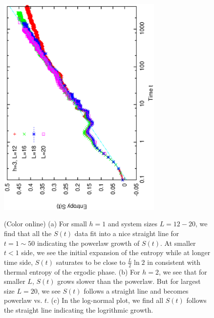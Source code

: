 \documentclass[prl,aps,epsf,showpacs,twocolumn]{revtex4}
\begin{document}
\begin{figure}[b]
   \includegraphics[angle=-90,width=3.2in]{newfig1e.ps}\\
  \vspace{0.12in}
  \caption{(Color online) (a) For small $h=1$ and system sizes $L=12-20$,   we
    find that all the $S(t)$ data fit into a nice straight line for $t=1\sim 50$
    indicating the powerlaw growth of $S(t)$.  At smaller $t<1$ side,  we see
    the initial expansion of the entropy  while at longer time  side, $S(t)$
    saturates to be close to $\frac L 2 \ln2$ in consistent with thermal entropy
    of the ergodic phase.  (b) For $h=2$,  we see that for smaller $L$, $S(t)$
    grows slower than the powerlaw.  But for largest size $L=20$, we see $S(t)$
    follows a straight line and becomes powerlaw vs. $t$.  (c) In the log-normal
    plot, we find all $S(t)$ follows the straight line indicating the logrithmic
    growth.
  }
\label{fig3}
\end{figure}
\end{document}
